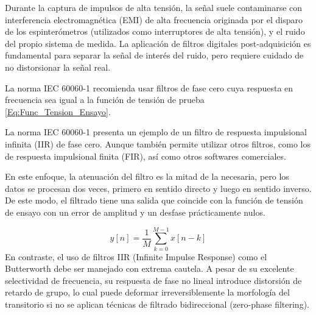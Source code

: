 Durante la captura de impulsos de alta tensión, la señal suele contaminarse con interferencia electromagnética (EMI) de alta frecuencia originada por el disparo de los espinterómetros (utilizados como interruptores de alta tensión), y el ruido del propio sistema de medida. La aplicación de filtros digitales post-adquisición es fundamental para separar la señal de interés del ruido, pero requiere cuidado de no distorsionar la señal real.\par
La norma IEC 60060-1 recomienda usar filtros de fase cero cuya respuesta en frecuencia sea igual a la función de tensión de prueba \autoref{Eq:Func_Tension_Ensayo}.\par
La norma IEC 60060-1 presenta un ejemplo de un filtro de respuesta impulsional infinita (IIR) de fase cero. Aunque también permite utilizar otros filtros, como los de respuesta impulsional finita (FIR), así como otros softwares comerciales.\par
En este enfoque, la atenuación del filtro es la mitad de la necesaria, pero los datos se procesan dos veces, primero en sentido directo y luego en sentido inverso. De este modo, el filtrado tiene una salida que coincide con la función de tensión de ensayo con un error de amplitud y un desfase prácticamente nulos.\par
$$y[n] = \frac{1}{M} \sum_{k=0}^{M-1} x[n-k]$$
En contraste, el uso de filtros IIR (Infinite Impulse Response) como el Butterworth debe ser manejado con extrema cautela. A pesar de su excelente selectividad de frecuencia, su respuesta de fase no lineal introduce distorsión de retardo de grupo, lo cual puede deformar irreversiblemente la morfología del transitorio si no se aplican técnicas de filtrado bidireccional (zero-phase filtering).\par